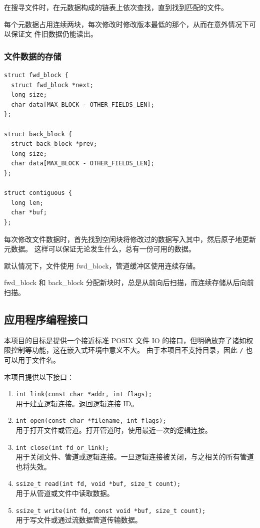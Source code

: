 \documentclass{ctexart}
\begin{document}
在搜寻文件时，在元数据构成的链表上依次查找，直到找到匹配的文件。

每个元数据占用连续两块，每次修改时修改版本最低的那个，从而在意外情况下可以保证文
件旧数据仍能读出。

\subsubsection{文件数据的存储}

\begin{verbatim}
struct fwd_block {
  struct fwd_block *next;
  long size;
  char data[MAX_BLOCK - OTHER_FIELDS_LEN];
};

struct back_block {
  struct back_block *prev;
  long size;
  char data[MAX_BLOCK - OTHER_FIELDS_LEN];
};

struct contiguous {
  long len;
  char *buf;
};
\end{verbatim}

每次修改文件数据时，首先找到空闲块将修改过的数据写入其中，然后原子地更新元数据。
这样可以保证无论发生什么，总有一份可用的数据。

默认情况下，文件使用 fwd\_block，管道缓冲区使用连续存储。

fwd\_block 和 back\_block 分配新块时，总是从前向后扫描，而连续存储从后向前扫描。

\subsection{应用程序编程接口}
\label{design-api}
本项目的目标是提供一个接近标准 POSIX 文件 IO 的接口，但明确放弃了诸如权限控制等功能，这在嵌入式环境中意义不大。
由于本项目不支持目录，因此 \verb|/| 也可以用于文件名。

本项目提供以下接口：
\begin{enumerate}
	\item \verb|int link(const char *addr, int flags);|\\
	用于建立逻辑连接。返回逻辑连接 ID。
	\item \verb|int open(const char *filename, int flags);|\\
	用于打开文件或管道。打开管道时，使用最近一次的逻辑连接。
	\item \verb|int close(int fd_or_link);|\\
	用于关闭文件、管道或逻辑连接。一旦逻辑连接被关闭，与之相关的所有管道也将失效。
	\item \verb|ssize_t read(int fd, void *buf, size_t count);|\\
	用于从管道或文件中读取数据。
	\item \verb|ssize_t write(int fd, const void *buf, size_t count);|\\
	用于写文件或通过流数据管道传输数据。
\end{enumerate}
\end{document}
